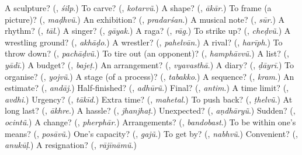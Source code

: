 \begin{tcolorbox}[breakable,colback=teal!4,colframe=teal!35!black,title={Before you move on}]
A sculpture? (\textbf{}, \emph{śilp}.) To carve? (\textbf{}, \emph{kotarvũ}.) A shape? (\textbf{}, \emph{ākār}.) To frame (a picture)? (\textbf{}, \emph{maḍhvũ}.) An exhibition? (\textbf{}, \emph{pradarśan}.) A musical note? (\textbf{}, \emph{sūr}.) A rhythm? (\textbf{}, \emph{tāl}.) A singer? (\textbf{}, \emph{gāyak}.) A raga? (\textbf{}, \emph{rāg}.) To strike up? (\textbf{}, \emph{cheḍvũ}.) A wrestling ground? (\textbf{}, \emph{akhāḍo}.) A wrestler? (\textbf{}, \emph{pahelvān}.) A rival? (\textbf{}, \emph{harīph}.) To throw down? (\textbf{}, \emph{pachāḍvũ}.) To tire out (an opponent)? (\textbf{}, \emph{hamphāvvũ}.) A list? (\textbf{}, \emph{yādī}.) A budget? (\textbf{}, \emph{bajeṭ}.) An arrangement? (\textbf{}, \emph{vyavasthā}.) A diary? (\textbf{}, \emph{ḍāyrī}.) To organise? (\textbf{}, \emph{yojvũ}.) A stage (of a process)? (\textbf{}, \emph{tabakko}.) A sequence? (\textbf{}, \emph{kram}.) An estimate? (\textbf{}, \emph{andāj}.) Half-finished? (\textbf{}, \emph{adhūrũ}.) Final? (\textbf{}, \emph{antim}.) A time limit? (\textbf{}, \emph{avdhi}.) Urgency? (\textbf{}, \emph{tākīd}.) Extra time? (\textbf{}, \emph{mahetal}.) To push back? (\textbf{}, \emph{ṭhelvũ}.) At long last? (\textbf{}, \emph{ākhre}.) A hassle? (\textbf{}, \emph{jhanjhaṭ}.) Unexpected? (\textbf{}, \emph{aṇdhāryũ}.) Sudden? (\textbf{}, \emph{ocintũ}.) A change? (\textbf{}, \emph{pherphār}.) Arrangements? (\textbf{}, \emph{bandobast}.) To be within one's means? (\textbf{}, \emph{posāvũ}.) One's capacity? (\textbf{}, \emph{gajũ}.) To get by? (\textbf{}, \emph{nabhvũ}.) Convenient? (\textbf{}, \emph{anukūḷ}.) A resignation? (\textbf{}, \emph{rājīnāmũ}.)
\end{tcolorbox}
